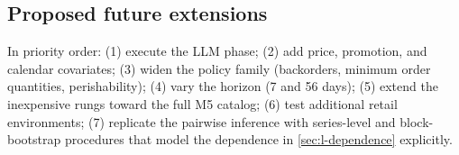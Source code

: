 \subsection{Proposed future extensions}
\label{sec:l-future}
In priority order: (1) execute the LLM phase; (2) add price, promotion, and
calendar covariates; (3) widen the policy family (backorders, minimum order
quantities, perishability); (4) vary the horizon (7 and 56 days); (5) extend
the inexpensive rungs toward the full M5 catalog; (6) test additional retail
environments; (7) replicate the pairwise inference with series-level and
block-bootstrap procedures that model the dependence in \cref{sec:l-dependence}
explicitly.

